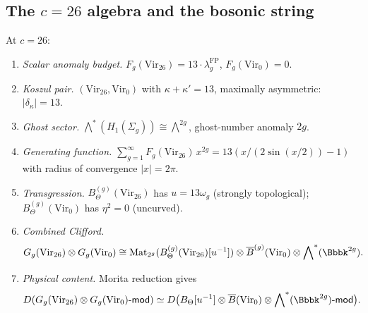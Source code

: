 %
%

\subsection{The $c = 26$ algebra and the bosonic string}

\begin{proposition}
At $c = 26$:
\begin{enumerate}[label=\textup{(\roman*)}]
\item \emph{Scalar anomaly budget.}\;
$F_g(\mathrm{Vir}_{26}) = 13 \cdot \lambda_g^{\mathrm{FP}}$,
$F_g(\mathrm{Vir}_0) = 0$.

\item \emph{Koszul pair.}\;
$(\mathrm{Vir}_{26}, \mathrm{Vir}_0)$ with $\kappa + \kappa' = 13$,
maximally asymmetric: $|\delta_\kappa| = 13$.

\item \emph{Ghost sector.}\;
$\bigwedge^*(H_1(\Sigma_g)) \cong \bigwedge^{2g}$, ghost-number
anomaly $2g$.

\item \emph{Generating function.}\;
$\sum_{g=1}^\infty F_g(\mathrm{Vir}_{26})\,x^{2g}
= 13(x/(2\sin(x/2)) - 1)$
with radius of convergence $|x| = 2\pi$.

\item \emph{Transgression.}\;
$B_\Theta^{(g)}(\mathrm{Vir}_{26})$ has $u = 13\omega_g$
(strongly topological); $B_\Theta^{(g)}(\mathrm{Vir}_0)$ has
$\eta^2 = 0$ (uncurved).

\item \emph{Combined Clifford.}\;
\begin{equation}%
G_g(\mathrm{Vir}_{26}) \otimes G_g(\mathrm{Vir}_0)
\cong
\mathrm{Mat}_{2^g}(B_\Theta^{(g)}(\mathrm{Vir}_{26})[u^{-1}])
\otimes \barB^{(g)}(\mathrm{Vir}_0)
\otimes \bigwedge\nolimits^*(\Bbbk^{2g}).
\end{equation}

\item \emph{Physical content.}\; Morita reduction gives
\begin{equation}%
D(G_g(\mathrm{Vir}_{26}) \otimes G_g(\mathrm{Vir}_0)
\text{-}\mathsf{mod})
\simeq
D\bigl(B_\Theta[u^{-1}] \otimes \barB(\mathrm{Vir}_0) \otimes
\bigwedge\nolimits^*(\Bbbk^{2g})\text{-}\mathsf{mod}\bigr).
\end{equation}
\end{enumerate}
\end{proposition}

